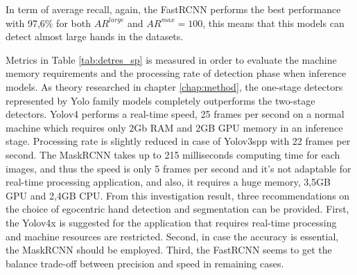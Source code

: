 In term of average recall, again, the FastRCNN performs the best performance with 97,6\% for both \(AR^{large}\) and \(AR^{max}=100\), this means that this models can detect almost large hands in the datasets.

Metrics in Table \ref{tab:detres_sp} is measured in order to evaluate the machine memory requirements and the processing rate of detection phase when inference models. As theory researched in chapter \ref{chap:method}, the one-stage detectors represented by Yolo family models completely outperforms the two-stage detectors. Yolov4 performs a real-time speed, 25 frames per second on a normal machine which requires only 2Gb RAM and 2GB GPU memory in an inference stage. Processing rate is slightly reduced in case of Yolov3spp with 22 frames per second. The MaskRCNN takes up to 215 milliseconds computing time for each images, and thus the speed is only 5 frames per second and it’s not adaptable for real-time processing application, and also, it requires a huge memory, 3,5GB GPU and 2,4GB CPU.
From this investigation result, three recommendations on the choice of egocentric hand detection and segmentation can be provided. First, the Yolov4x is suggested for the application that requires real-time processing and machine resources are restricted. Second, in case the accuracy is essential, the MaskRCNN should be employed. Third, the FastRCNN seems to get the balance trade-off between precision and speed in remaining cases.

